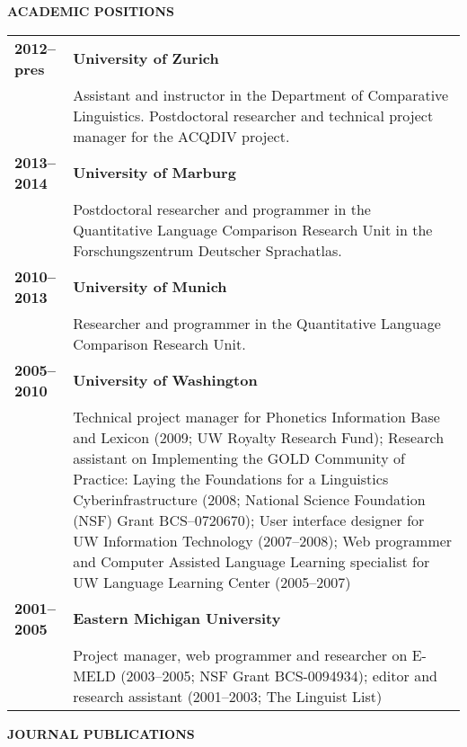 \documentclass[11pt]{article}
\begin{document}
\vskip 20pt
\begin{flushleft}
{\bf ACADEMIC POSITIONS}
\end{flushleft}
\begin{tabular}{lp{5.5in}}
\bf 2012--pres & {\bf University of Zurich} \\
& Assistant and instructor in the Department of Comparative Linguistics. Postdoctoral researcher and technical project manager for the ACQDIV project.\\

\bf 2013--2014 & {\bf University of Marburg} \\
& Postdoctoral researcher and programmer in the Quantitative Language Comparison Research Unit in the Forschungszentrum Deutscher Sprachatlas. \\

\bf 2010--2013 & {\bf University of Munich} \\
& Researcher and programmer in the Quantitative Language Comparison Research Unit. \\

\bf 2005--2010 & {\bf University of Washington} \\
& Technical project manager for Phonetics Information Base and Lexicon (2009; UW Royalty Research Fund); Research assistant on Implementing the GOLD Community of Practice: Laying the Foundations for a Linguistics Cyberinfrastructure (2008; National Science Foundation (NSF) Grant BCS--0720670); User interface designer for UW Information Technology (2007--2008); Web programmer and Computer Assisted Language Learning specialist for UW Language Learning Center (2005--2007) \\

\bf 2001--2005 & {\bf Eastern Michigan University} \\ 
& Project manager, web programmer and researcher on E-MELD (2003--2005; NSF Grant BCS-0094934); editor and research assistant (2001--2003; The Linguist List)\\
\end{tabular}


\vskip 20pt
\begin{flushleft}
{\bf JOURNAL PUBLICATIONS}
\end{flushleft}
\end{document}

